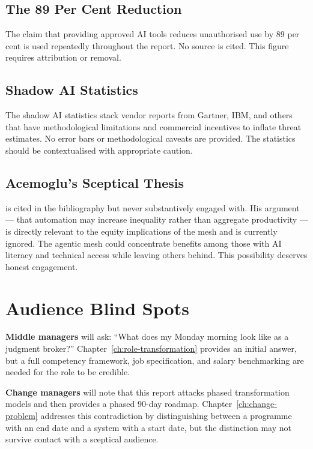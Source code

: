 \subsection{The 89 Per Cent Reduction}

The claim that providing approved AI tools reduces unauthorised use by 89 per cent is used repeatedly throughout the report. No source is cited. This figure requires attribution or removal.

\subsection{Shadow AI Statistics}

The shadow AI statistics stack vendor reports from Gartner, IBM, and others that have methodological limitations and commercial incentives to inflate threat estimates. No error bars or methodological caveats are provided. The statistics should be contextualised with appropriate caution.

\subsection{Acemoglu's Sceptical Thesis}

\textcite{Acemoglu2019} is cited in the bibliography but never substantively engaged with. His argument --- that automation may increase inequality rather than aggregate productivity --- is directly relevant to the equity implications of the mesh and is currently ignored. The agentic mesh could concentrate benefits among those with AI literacy and technical access while leaving others behind. This possibility deserves honest engagement.

\section{Audience Blind Spots}

\textbf{Middle managers} will ask: ``What does my Monday morning look like as a judgment broker?'' Chapter~\ref{ch:role-transformation} provides an initial answer, but a full competency framework, job specification, and salary benchmarking are needed for the role to be credible.

\textbf{Change managers} will note that this report attacks phased transformation models and then provides a phased 90-day roadmap. Chapter~\ref{ch:change-problem} addresses this contradiction by distinguishing between a programme with an end date and a system with a start date, but the distinction may not survive contact with a sceptical audience.

